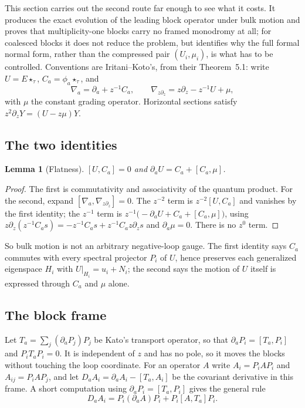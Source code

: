 \documentclass[11pt]{article}
\newtheorem{lemma}[theorem]{Lemma}
\theoremstyle{definition}
\theoremstyle{remark}
\begin{document}
This section carries out the second route far enough to see what it costs. It
produces the exact evolution of the leading block operator under bulk motion and
proves that multiplicity-one blocks carry no framed monodromy at all; for
coalesced blocks it does not reduce the problem, but identifies why the full
formal normal form, rather than the compressed pair $(U_i,\mu_i)$, is what has to
be controlled. Conventions are Iritani--Koto's, from their
Theorem~5.1: write $U=E\star_\tau$, $C_a=\phi_a\star_\tau$, and
\[
  \nabla_a=\partial_a+z^{-1}C_a,\qquad
  \nabla_{z\partial_z}=z\partial_z-z^{-1}U+\mu ,
\]
with $\mu$ the constant grading operator. Horizontal sections satisfy
$z^2\partial_zY=(U-z\mu)Y$.

\subsection*{The two identities}

\begin{lemma}[Flatness]
\label{lem:flatness-ids}
$[U,C_a]=0$ and $\partial_aU=C_a+[C_a,\mu]$.
\end{lemma}

\begin{proof}
The first is commutativity and associativity of the quantum product. For the
second, expand $[\nabla_a,\nabla_{z\partial_z}]=0$. The $z^{-2}$ term is
$z^{-2}[U,C_a]$ and vanishes by the first identity; the $z^{-1}$ term is
$z^{-1}\bigl(-\partial_aU+C_a+[C_a,\mu]\bigr)$, using
$z\partial_z(z^{-1}C_as)=-z^{-1}C_as+z^{-1}C_az\partial_zs$ and
$\partial_a\mu=0$. There is no $z^0$ term.
\end{proof}

So bulk motion is not an arbitrary negative-loop gauge. The first identity says
$C_a$ commutes with every spectral projector $P_i$ of $U$, hence preserves each
generalized eigenspace $H_i$ with $U|_{H_i}=u_i+N_i$; the second says the motion
of $U$ itself is expressed through $C_a$ and $\mu$ alone.

\subsection*{The block frame}

Let $T_a=\sum_j(\partial_aP_j)P_j$ be Kato's transport operator, so that
$\partial_aP_i=[T_a,P_i]$ and $P_iT_aP_i=0$. It is independent of $z$ and has no
pole, so it moves the blocks without touching the loop coordinate. For an
operator $A$ write $A_i=P_iAP_i$ and $A_{ij}=P_iAP_j$, and let
$D_aA_i=\partial_aA_i-[T_a,A_i]$ be the covariant derivative in this frame. A
short computation using $\partial_aP_i=[T_a,P_i]$ gives the general rule
\[
  D_aA_i=P_i(\partial_aA)P_i+P_i[A,T_a]P_i .
  \tag{6.1}
  \label{eq:block-covariant-rule}
\]
\end{document}
